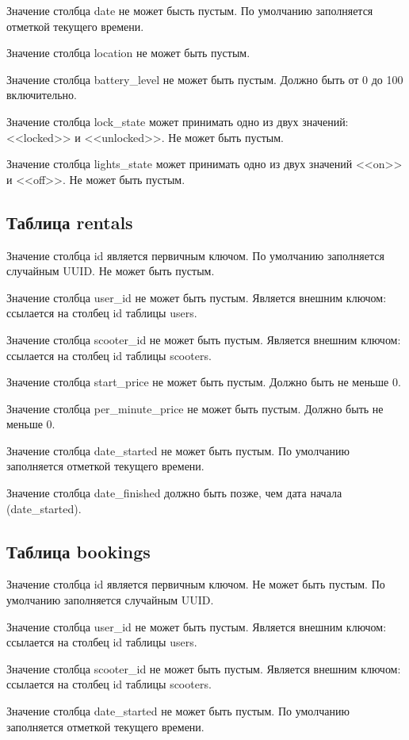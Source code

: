 Значение столбца date не может бысть пустым. По умолчанию заполняется отметкой текущего времени.

Значение столбца location не может быть пустым.

Значение столбца battery\_level не может быть пустым. Должно быть от 0 до 100 включительно.

Значение столбца lock\_state может принимать одно из двух значений: <<locked>> и <<unlocked>>. Не может быть пустым.

Значение столбца lights\_state может принимать одно из двух значений <<on>> и <<off>>. Не может быть пустым.

\subsection{Таблица rentals}

Значение столбца id является первичным ключом. По умолчанию заполняется случайным UUID. Не может быть пустым.

Значение столбца user\_id не может быть пустым. Является внешним ключом: ссылается на столбец id таблицы users.

Значение столбца scooter\_id не может быть пустым. Является внешним ключом: ссылается на столбец id таблицы scooters.

Значение столбца start\_price не может быть пустым. Должно быть не меньше 0.

Значение столбца per\_minute\_price не может быть пустым. Должно быть не меньше 0.

Значение столбца date\_started не может быть пустым. По умолчанию заполняется отметкой текущего времени.

Значение столбца date\_finished должно быть позже, чем дата начала (date\_started).

\subsection{Таблица bookings}

Значение столбца id является первичным ключом. Не может быть пустым. По умолчанию заполняется случайным UUID.

Значение столбца user\_id не может быть пустым. Является внешним ключом: ссылается на столбец id таблицы users.

Значение столбца scooter\_id не может быть пустым. Является внешним ключом: ссылается на столбец id таблицы scooters.

Значение столбца date\_started не может быть пустым. По умолчанию заполняется отметкой текущего времени.

